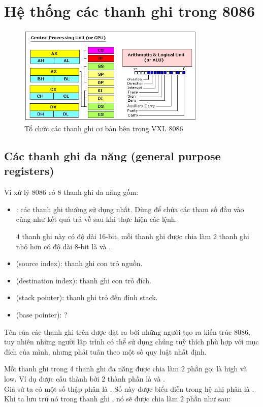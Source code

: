 \documentclass[main.tex]{subfiles}
\begin{document}
\section{Hệ thống các thanh ghi trong 8086}

\begin{figure}[H]
    \centering
    \includegraphics[width=0.8\textwidth]{image/cpu.png}
    \caption{Tổ chức các thanh ghi cơ bản bên trong VXL 8086}
\end{figure}

\subsection{Các thanh ghi đa năng (general purpose registers)}
Vi xử lý 8086 có 8 thanh ghi đa năng gồm:
\begin{itemize}
    \item {}: các thanh ghi thường sử dụng nhất. Dùng để chứa các tham số đầu vào cũng như kết quả trả về sau khi thực hiện các lệnh.
    \par 4 thanh ghi này có độ dài 16-bit, mỗi thanh ghi được chia làm 2 thanh ghi nhỏ hơn có độ dài 8-bit là  và .
    \item {} (source index): thanh ghi con trỏ nguồn.
    \item {} (destination index): thanh ghi con trỏ đích.
    \item {} (stack pointer): thanh ghi trỏ đến đỉnh stack.
    \item {} (base pointer): ?
\end{itemize}

Tên của các thanh ghi trên được đặt ra bởi những người tạo ra kiến trúc 8086, tuy nhiên những người lập trình có thể sử dụng chúng tuỳ thích phù hợp với mục đích của mình, nhưng phải tuân theo một số quy luật nhất định.\bigskip

Mỗi thanh ghi trong 4 thanh ghi đa năng  được chia làm 2 phần gọi là high và low. Ví dụ  được cấu thành bởi 2 thành phần là  và .\\
Giả sử ta có một số thập phân là . Số này được biểu diễn trong hệ nhị phân là \textcolor{red}{}\textcolor{blue}{}. Khi ta lưu trữ nó trong thanh ghi , nó sẽ được chia làm 2 phần như sau:
\end{document}
